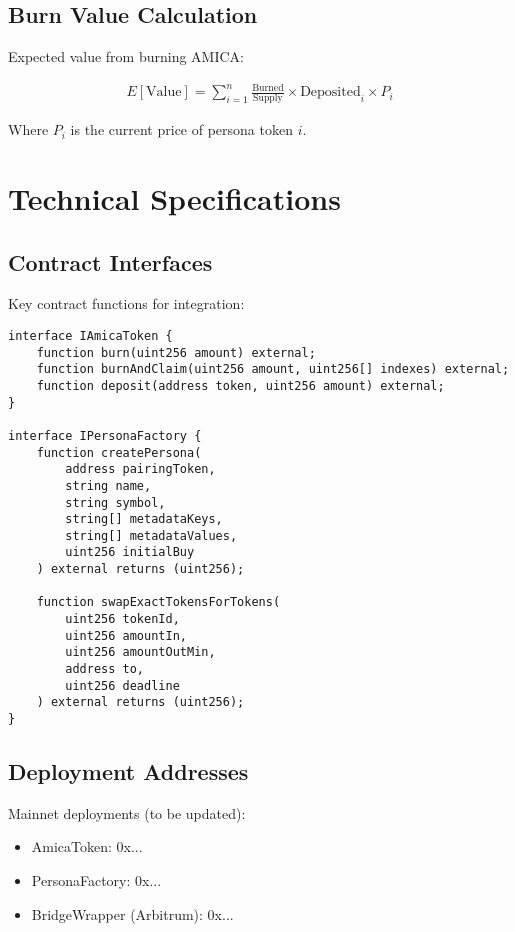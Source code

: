 \documentclass{article}
\begin{document}
\begin{appendices}
\subsection{Burn Value Calculation}

Expected value from burning AMICA:

\begin{align}
E[\text{Value}] = \sum_{i=1}^{n} \frac{\text{Burned}}{\text{Supply}} \times \text{Deposited}_i \times P_i
\end{align}

Where $P_i$ is the current price of persona token $i$.

\section{Technical Specifications}

\subsection{Contract Interfaces}

Key contract functions for integration:

\begin{verbatim}
interface IAmicaToken {
    function burn(uint256 amount) external;
    function burnAndClaim(uint256 amount, uint256[] indexes) external;
    function deposit(address token, uint256 amount) external;
}

interface IPersonaFactory {
    function createPersona(
        address pairingToken,
        string name,
        string symbol,
        string[] metadataKeys,
        string[] metadataValues,
        uint256 initialBuy
    ) external returns (uint256);
    
    function swapExactTokensForTokens(
        uint256 tokenId,
        uint256 amountIn,
        uint256 amountOutMin,
        address to,
        uint256 deadline
    ) external returns (uint256);
}
\end{verbatim}

\subsection{Deployment Addresses}

Mainnet deployments (to be updated):
\begin{itemize}
    \item AmicaToken: 0x...
    \item PersonaFactory: 0x...
    \item BridgeWrapper (Arbitrum): 0x...
\end{itemize}

\end{appendices}
\end{document}
